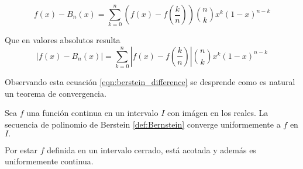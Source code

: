\begin{equation}
    f(x)-B_n(x) = \sum_{k=0}^n \left(f(x) - f \left( \frac{k}{n} \right)\right)
    \binom{n}{k} x^{k} (1-x)^{n-k}
\end{equation} 

Que en valores absolutos resulta 
\begin{equation} \label{eqn:berstein_difference}
    |f(x)-B_n(x)| = \sum_{k=0}^n \left|f(x) - f \left( \frac{k}{n} \right)\right|
    \binom{n}{k} x^{k} (1-x)^{n-k}
\end{equation} 

Observando esta ecuación \ref{eqn:berstein_difference} se desprende como es natural un teorema de convergencia. 

\begin{theorem}

    Sea $f$ una función continua en un intervalo $I$ con imágen en los reales. 
    La secuencia de polinomio de Berstein
    \ref{def:Bernstein} converge uniformemente a $f$ en $I.$
    
\end{theorem}

Por estar $f$ definida en un intervalo cerrado, está acotada y además es uniformemente continua. 
\endinput 